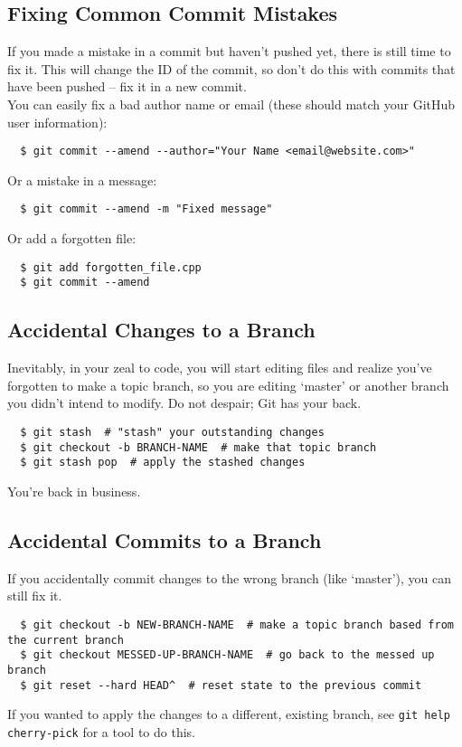 \documentclass{article}
\begin{document}
\subsection{Fixing Common Commit Mistakes}
If you made a mistake in a commit but haven't pushed yet, there is
still time to fix it. This will change the ID of the commit, so don't do this
with commits that have been pushed -- fix it in a new commit.\\

You can easily fix a bad author name or email (these should match your
GitHub user information):
\begin{verbatim}
  $ git commit --amend --author="Your Name <email@website.com>"
\end{verbatim}
Or a mistake in a message:
\begin{verbatim}
  $ git commit --amend -m "Fixed message"
\end{verbatim}
Or add a forgotten file:
\begin{verbatim}
  $ git add forgotten_file.cpp
  $ git commit --amend
\end{verbatim}

\subsection{Accidental Changes to a Branch}
Inevitably, in your zeal to code, you will start editing files and realize
you've forgotten to make a topic branch, so you are editing `master' or
another branch you didn't intend to modify. Do not despair; Git has your back.

\begin{verbatim}
  $ git stash  # "stash" your outstanding changes
  $ git checkout -b BRANCH-NAME  # make that topic branch
  $ git stash pop  # apply the stashed changes
\end{verbatim}
You're back in business.

\subsection{Accidental Commits to a Branch}
If you accidentally commit changes to the wrong branch (like `master'), you can
still fix it.

\begin{verbatim}
  $ git checkout -b NEW-BRANCH-NAME  # make a topic branch based from the current branch
  $ git checkout MESSED-UP-BRANCH-NAME  # go back to the messed up branch
  $ git reset --hard HEAD^  # reset state to the previous commit
\end{verbatim}
If you wanted to apply the changes to a different, existing branch, see
{\tt git help cherry-pick} for a tool to do this.
\end{document}

